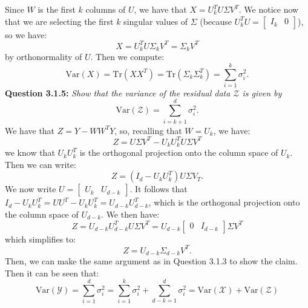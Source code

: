 \documentclass{article}
\begin{document}
\begin{multicols}{2}
    
    Since $W$ is the first $k$ columns of $U$, we have that $X=U^T_kU\Sigma V^T$. We notice now 
    that we are selecting the first $k$ singular values of $\Sigma$ (because $U^T_kU = \begin{bmatrix}
        I_k & 0
    \end{bmatrix} $), so we have:
    \begin{equation*}
        X = U^T_kU\Sigma_kV^T = \Sigma_kV^T 
    \end{equation*}
    by orthonormality of $U$. Then we compute:
    \begin{equation*}
        \text{Var}(X) = \text{Tr}(XX^T) = \text{Tr}(\Sigma_k \Sigma_k^T) = \sum_{i=1}^k\sigma_i^2.
    \end{equation*}
    \noindent \textbf{Question 3.1.5:}  
    \textit{Show that the variance of the residual data \( \mathcal{Z} \) is given by}  
    \[
    \text{Var}(\mathcal{Z}) = \sum_{i=k+1}^d \sigma_i^2.
    \]
    We have that $Z = Y - WW^TY$, so, recalling that $W=U_k$, we have:
    \begin{equation*}
        Z =U \Sigma V^T - U_kU_k^TU\Sigma V^T
    \end{equation*}
    we know that $U_kU_k^T$ is the orthogonal projection onto the column space of $U_k$. Then we can write:
    \begin{equation*}
        Z = (I_d - U_kU_k^T)U \Sigma V_T.
    \end{equation*}
    We now write $U = \begin{bmatrix}
        U_k & U_{d-k}
    \end{bmatrix}$. It follows that  $I_d - U_kU_k^T = UU^T - U_kU_k^T  = U_{d-k}U_{d-k}^T$, which is the orthogonal projection onto the column space of $U_{d-k}$. We then have:
    \begin{equation*}
        Z = U_{d-k}U_{d-k}^TU \Sigma V^T = U_{d-k}\begin{bmatrix}
            0 & I_{d-k}
        \end{bmatrix} \Sigma V^T
    \end{equation*}
    which simplifies to:
    \begin{equation*}
        Z = U_{d-k} \Sigma_{d-k} V^T.
    \end{equation*}
    Then, we can make the same argument as in Question 3.1.3 to show the claim. 
    Then it can be seen that:
    \begin{equation*}
        \text{Var}(\mathcal{Y}) = \sum_{i=1}^d \sigma_i^2=  \sum_{i=1}^k \sigma_i^2 + \sum_{d-k=1}^d \sigma_i^2 =\text{Var}(\mathcal{X}) +\text{Var}(\mathcal{Z})
    \end{equation*}
    \newpage


\end{multicols}
\end{document}
